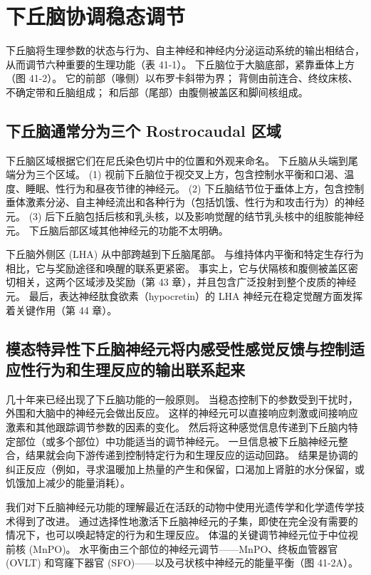 \section{下丘脑协调稳态调节}
下丘脑将生理参数的状态与行为、自主神经和神经内分泌运动系统的输出相结合，从而调节六种重要的生理功能（表 41-1）。 下丘脑位于大脑底部，紧靠垂体上方（图 41-2）。 它的前部（喙侧）以布罗卡斜带为界； 背侧由前连合、终纹床核、不确定带和丘脑组成； 和后部（尾部）由腹侧被盖区和脚间核组成。

\subsection{下丘脑通常分为三个 Rostrocaudal 区域}
下丘脑区域根据它们在尼氏染色切片中的位置和外观来命名。 下丘脑从头端到尾端分为三个区域。 (1) 视前下丘脑位于视交叉上方，包含控制水平衡和口渴、温度、睡眠、性行为和昼夜节律的神经元。 (2) 下丘脑结节位于垂体上方，包含控制垂体激素分泌、自主神经流出和各种行为（包括饥饿、性行为和攻击行为）的神经元。 (3) 后下丘脑包括后核和乳头核，以及影响觉醒的结节乳头核中的组胺能神经元。 下丘脑后部区域其他神经元的功能不太明确。

下丘脑外侧区 (LHA) 从中部跨越到下丘脑尾部。 与维持体内平衡和特定生存行为相比，它与奖励途径和唤醒的联系更紧密。 事实上，它与伏隔核和腹侧被盖区密切相关，这两个区域涉及奖励（第 43 章），并且包含广泛投射到整个皮质的神经元。 最后，表达神经肽食欲素（hypocretin）的 LHA 神经元在稳定觉醒方面发挥着关键作用（第 44 章）。

\subsection{模态特异性下丘脑神经元将内感受性感觉反馈与控制适应性行为和生理反应的输出联系起来}
几十年来已经出现了下丘脑功能的一般原则。 当稳态控制下的参数受到干扰时，外围和大脑中的神经元会做出反应。 这样的神经元可以直接响应刺激或间接响应激素和其他跟踪调节参数的因素的变化。 然后将这种感觉信息传递到下丘脑内特定部位（或多个部位）中功能适当的调节神经元。 一旦信息被下丘脑神经元整合，结果就会向下游传递到控制特定行为和生理反应的运动回路。 结果是协调的纠正反应（例如，寻求温暖加上热量的产生和保留，口渴加上肾脏的水分保留，或饥饿加上减少的能量消耗）。

我们对下丘脑神经元功能的理解最近在活跃的动物中使用光遗传学和化学遗传学技术得到了改进。 通过选择性地激活下丘脑神经元的子集，即使在完全没有需要的情况下，也可以唤起特定的行为和生理反应。 体温的关键调节神经元位于中位视前核 (MnPO)。 水平衡由三个部位的神经元调节——MnPO、终板血管器官 (OVLT) 和穹窿下器官 (SFO)——以及弓状核中神经元的能量平衡（图 41-2A）。



